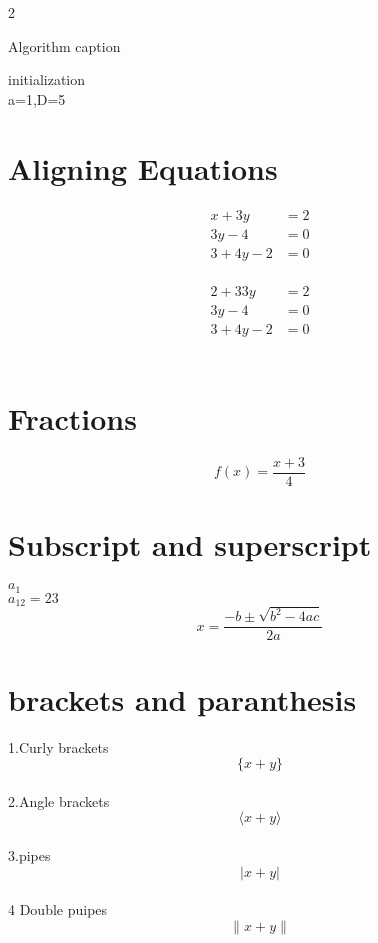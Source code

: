 \documentclass[12pt]{book}
\begin{document}
\begin {multicols}{2}
\begin{algorithm}[H]
\SetAlgoLined %
\caption{Algorithm caption}
initialization\\
a=1,D=5 \;

\end{algorithm}


\section {Aligning Equations}
\begin{align}
 x+3y &=2 \nonumber\\
 3y-4&=0 \\
 3+4y-2&=0
\end{align}\\
\begin{align*}
 2+33y &=2 \\
 3y-4&=0 \\
 3+4y-2&=0
\end{align*}\\
\section{Fractions}
$$ f(x) = \frac{x+3}{4}$$
\section {Subscript and superscript}
$ a_1 $ \\
$a_{12} =23$ \\
\begin{equation}
x=\frac{-b \pm \sqrt{b^2-4ac}}{2a} 
\end{equation}
\section{brackets and paranthesis}
1.Curly brackets $$ \{ x+y \}  $$\\
2.Angle brackets $$ \langle x+y \rangle $$\\
3.pipes $$ |x+y| $$ \\
4 Double puipes $$ \|  x+y \| $$ \\


\end{multicols}
\end{document}
